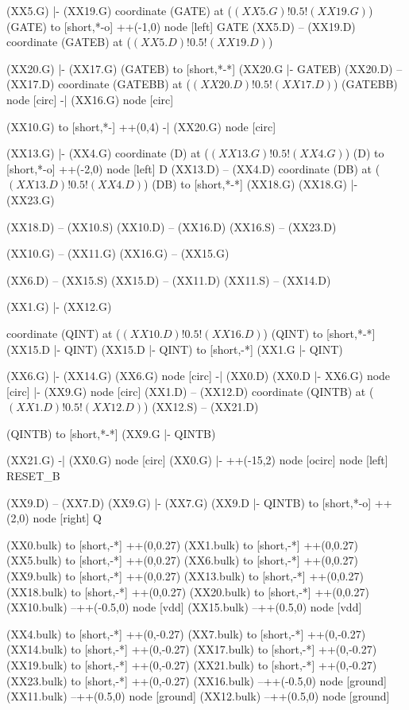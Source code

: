 \begin{circuitikz}[american]
	(XX5.G) |- (XX19.G)
	coordinate (GATE) at ($(XX5.G)!0.5!(XX19.G)$)
	(GATE) to [short,*-o] ++(-1,0) node [left] {GATE}
	(XX5.D) -- (XX19.D)
	coordinate (GATEB) at ($(XX5.D)!0.5!(XX19.D)$)
	
	(XX20.G) |- (XX17.G)
	(GATEB) to [short,*-*] (XX20.G |- GATEB)
	(XX20.D) -- (XX17.D)
	coordinate (GATEBB) at ($(XX20.D)!0.5!(XX17.D)$)
	(GATEBB) node [circ] {} -| (XX16.G) node [circ] {}
	
	(XX10.G) to [short,*-] ++(0,4) -| (XX20.G) node [circ] {}
	
	(XX13.G) |- (XX4.G)
	coordinate (D) at ($(XX13.G)!0.5!(XX4.G)$)
	(D) to [short,*-o] ++(-2,0) node [left] {D}
	(XX13.D) -- (XX4.D) 
	coordinate (DB) at ($(XX13.D)!0.5!(XX4.D)$)
	(DB) to [short,*-*] (XX18.G)
	(XX18.G) |- (XX23.G)
	
	(XX18.D) -- (XX10.S) 
	(XX10.D) -- (XX16.D)
	(XX16.S) -- (XX23.D)
	
	(XX10.G) -- (XX11.G)
	(XX16.G) -- (XX15.G)
	
	(XX6.D) -- (XX15.S)
	(XX15.D) -- (XX11.D)
	(XX11.S) -- (XX14.D)
	
	(XX1.G) |- (XX12.G)	
	
	coordinate (QINT) at ($(XX10.D)!0.5!(XX16.D)$)
	(QINT) to [short,*-*] (XX15.D |- QINT)
	(XX15.D |- QINT) to [short,-*] (XX1.G |- QINT)	
	
	(XX6.G) |- (XX14.G)
	(XX6.G) node [circ] {} -| (XX0.D)
	(XX0.D |- XX6.G) node [circ] {} |- (XX9.G) node [circ] {} 
	(XX1.D) -- (XX12.D)
	coordinate (QINTB) at ($(XX1.D)!0.5!(XX12.D)$)
	(XX12.S) -- (XX21.D)

	(QINTB) to [short,*-*] (XX9.G |- QINTB)
	
	(XX21.G) -| (XX0.G) node [circ] {}
	(XX0.G) |- ++(-15,2) node [ocirc] {} node [left] {RESET\_B}
		
	(XX9.D) -- (XX7.D)
	(XX9.G) |- (XX7.G)
	(XX9.D |- QINTB) to [short,*-o] ++(2,0) node [right] {Q} 
	
	(XX0.bulk) to [short,-*] ++(0,0.27)
	(XX1.bulk) to [short,-*] ++(0,0.27)
	(XX5.bulk) to [short,-*] ++(0,0.27)
	(XX6.bulk) to [short,-*] ++(0,0.27)
	(XX9.bulk) to [short,-*] ++(0,0.27)
	(XX13.bulk) to [short,-*] ++(0,0.27)
	(XX18.bulk) to [short,-*] ++(0,0.27)	
	(XX20.bulk) to [short,-*] ++(0,0.27)	
	(XX10.bulk) --++(-0.5,0) node [vdd] {}
	(XX15.bulk) --++(0.5,0) node [vdd] {}
	
	(XX4.bulk) to [short,-*] ++(0,-0.27)
	(XX7.bulk) to [short,-*] ++(0,-0.27)
	(XX14.bulk) to [short,-*] ++(0,-0.27)
	(XX17.bulk) to [short,-*] ++(0,-0.27)
	(XX19.bulk) to [short,-*] ++(0,-0.27)
	(XX21.bulk) to [short,-*] ++(0,-0.27)
	(XX23.bulk) to [short,-*] ++(0,-0.27)
	(XX16.bulk) --++(-0.5,0) node [ground] {}
	(XX11.bulk) --++(0.5,0) node [ground] {}
	(XX12.bulk) --++(0.5,0) node [ground] {}


\end{circuitikz}
